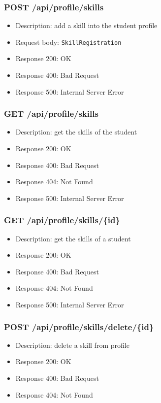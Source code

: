 \subsubsection{POST /api/profile/skills}
\begin{itemize}
    \item Description: add a skill into the student profile
    \item Request body: \verb|SkillRegistration|
    \item Response 200: OK
    \item Response 400: Bad Request
    \item Response 500: Internal Server Error
\end{itemize}

\subsubsection{GET /api/profile/skills}
\begin{itemize}
    \item Description: get the skills of the student
    \item Response 200: OK
    \item Response 400: Bad Request
    \item Response 404: Not Found
    \item Response 500: Internal Server Error
\end{itemize}

\subsubsection{GET /api/profile/skills/\{id\}}
\begin{itemize}
    \item Description: get the skills of a student
    \item Response 200: OK
    \item Response 400: Bad Request
    \item Response 404: Not Found
    \item Response 500: Internal Server Error
\end{itemize}

\subsubsection{POST /api/profile/skills/delete/\{id\}}
\begin{itemize}
    \item Description: delete a skill from profile
    \item Response 200: OK
    \item Response 400: Bad Request
    \item Response 404: Not Found
\end{itemize}

